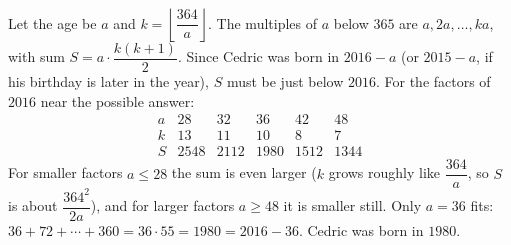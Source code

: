 Let the age be $a$ and $k=\left\lfloor\dfrac{364}{a}\right\rfloor$. The multiples of $a$ below $365$ are $a,2a,\dots,ka$, with sum $S=a\cdot\dfrac{k(k+1)}{2}$. Since Cedric was born in $2016-a$ (or $2015-a$, if his birthday is later in the year), $S$ must be just below $2016$. For the factors of $2016$ near the possible answer:
\[
\begin{array}{c|ccccc}
a&28&32&36&42&48\\ \hline
k&13&11&10&8&7\\
S&2548&2112&1980&1512&1344
\end{array}
\]
For smaller factors $a\le28$ the sum is even larger ($k$ grows roughly like $\dfrac{364}{a}$, so $S$ is about $\dfrac{364^2}{2a}$), and for larger factors $a\ge48$ it is smaller still. Only $a=36$ fits: $36+72+\cdots+360=36\cdot55=1980=2016-36$. Cedric was born in $\boxed{1980}$.
